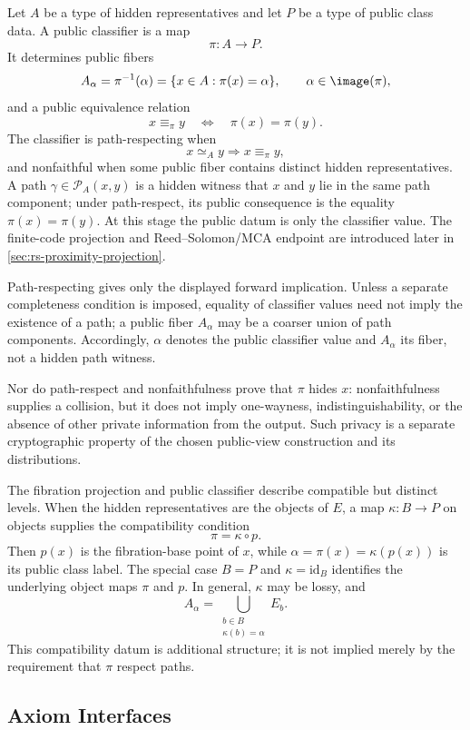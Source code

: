 Let \(A\) be a type of hidden representatives and let \(P\) be a type of public
class data. A public classifier is a map
\[
  \pi:A\longrightarrow P.
\]
It determines public fibers
\[
  A_\alpha=\pi^{-1}(\alpha)=\{x\in A:\pi(x)=\alpha\},
  \qquad \alpha\in\image(\pi),
\]
and a public equivalence relation
\[
  x\equiv_{\pi}y
  \quad\Longleftrightarrow\quad
  \pi(x)=\pi(y).
\]
The classifier is path-respecting when
\[
  x\simeq_A y\Longrightarrow x\equiv_{\pi}y,
\]
and nonfaithful when some public fiber contains distinct hidden
representatives. A path \(\gamma\in\mathcal P_A(x,y)\) is a hidden witness
that \(x\) and \(y\) lie in the same path component; under path-respect, its
public consequence is the equality \(\pi(x)=\pi(y)\). At this stage the public
datum is only the classifier value. The finite-code projection and
Reed--Solomon/MCA endpoint are introduced later in
\cref{sec:rs-proximity-projection}.

Path-respecting gives only the displayed forward implication. Unless a
separate completeness condition is imposed, equality of classifier values
need not imply the existence of a path; a public fiber \(A_\alpha\) may be a
coarser union of path components. Accordingly, \(\alpha\) denotes the public
classifier value and \(A_\alpha\) its fiber, not a hidden path witness.

Nor do path-respect and nonfaithfulness prove that \(\pi\) hides \(x\):
nonfaithfulness supplies a collision, but it does not imply one-wayness,
indistinguishability, or the absence of other private information from the
output. Such privacy is a separate cryptographic property of the chosen
public-view construction and its distributions.

The fibration projection and public classifier describe compatible but
distinct levels. When the hidden representatives are the objects of \(E\), a
map \(\kappa:B\to P\) on objects supplies the compatibility condition
\[
  \pi=\kappa\circ p.
\]
Then \(p(x)\) is the fibration-base point of \(x\), while
\(\alpha=\pi(x)=\kappa(p(x))\) is its public class label. The special case
\(B=P\) and \(\kappa=\mathrm{id}_B\) identifies the underlying object maps
\(\pi\) and \(p\). In general, \(\kappa\) may be lossy, and
\[
  A_\alpha
  =\bigcup_{\substack{b\in B\\ \kappa(b)=\alpha}}E_b.
\]
This compatibility datum is additional structure; it is not implied merely by
the requirement that \(\pi\) respect paths.

\subsection{Axiom Interfaces}

